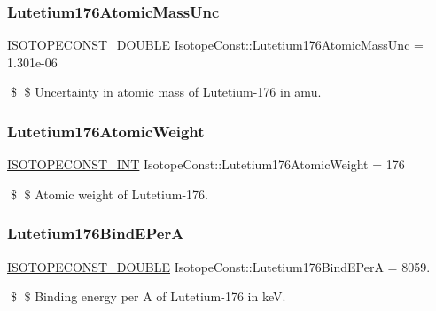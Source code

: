 \subsubsection{\texorpdfstring{Lutetium176\+Atomic\+Mass\+Unc}{Lutetium176AtomicMassUnc}}
{\footnotesize\ttfamily \mbox{\hyperlink{group___isotope_const-_macros_ga8f45a7272ce02c0b4c65c44636ed719a}{I\+S\+O\+T\+O\+P\+E\+C\+O\+N\+S\+T\+\_\+\+D\+O\+U\+B\+LE}} Isotope\+Const\+::\+Lutetium176\+Atomic\+Mass\+Unc = 1.\+301e-\/06}

\$ \$ Uncertainty in atomic mass of Lutetium-\/176 in amu. \mbox{\label{group___isotope_const-_lutetium-_lu176_gad3d9c30056b6e7d6b6882b0d7656cd86}} 
\subsubsection{\texorpdfstring{Lutetium176\+Atomic\+Weight}{Lutetium176AtomicWeight}}
{\footnotesize\ttfamily \mbox{\hyperlink{group___isotope_const-_macros_ga5f18360b3e99483a35c32d789e62621c}{I\+S\+O\+T\+O\+P\+E\+C\+O\+N\+S\+T\+\_\+\+I\+NT}} Isotope\+Const\+::\+Lutetium176\+Atomic\+Weight = 176}

\$ \$ Atomic weight of Lutetium-\/176. \mbox{\label{group___isotope_const-_lutetium-_lu176_ga9ee514b2a7e62b9c66effdbafb73facb}} 
\subsubsection{\texorpdfstring{Lutetium176\+Bind\+E\+PerA}{Lutetium176BindEPerA}}
{\footnotesize\ttfamily \mbox{\hyperlink{group___isotope_const-_macros_ga8f45a7272ce02c0b4c65c44636ed719a}{I\+S\+O\+T\+O\+P\+E\+C\+O\+N\+S\+T\+\_\+\+D\+O\+U\+B\+LE}} Isotope\+Const\+::\+Lutetium176\+Bind\+E\+PerA = 8059.}

\$ \$ Binding energy per A of Lutetium-\/176 in keV. \mbox{\label{group___isotope_const-_lutetium-_lu176_ga92430b7844276ea22097eb1e0c230cdb}} 
